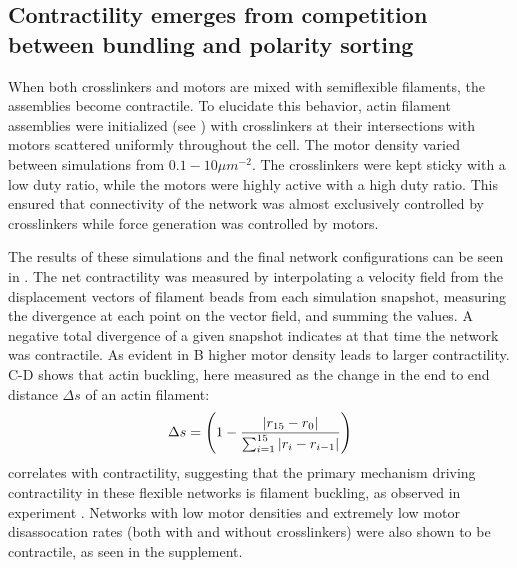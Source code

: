 \documentclass[12pt]{article}
\begin{document}
\subsection{Contractility emerges from competition between bundling and polarity sorting}
\par
When both crosslinkers and motors are mixed with semiflexible filaments, the
assemblies become contractile. To elucidate this behavior, actin filament 
assemblies were initialized (see ) with crosslinkers at their
intersections with motors scattered uniformly throughout the cell. The motor
density varied between simulations from $0.1-10\mu m^{-2}$. The crosslinkers 
were kept sticky with a low duty ratio, while the motors were highly active with
a high duty ratio. This ensured that connectivity of the network was almost
exclusively controlled by crosslinkers while force generation was controlled by
motors. 
\par
The results of these simulations and the final network configurations can be
seen in . The net contractility was measured by
interpolating a velocity field from the displacement vectors of filament beads
from each simulation snapshot, 
measuring the divergence at each point on the vector field, and summing the 
values. A negative total divergence of a given snapshot indicates at that time
the network was contractile. As evident in B
higher motor density leads to larger contractility. C-D shows
that actin buckling, here measured as the change in the end to end distance
$\Delta s$ of an actin filament:
\begin{equation} 
  \Delta s = \left(1 - {|r_{15}-r_0|\over\sum_{i=1}^{15}{|r_i-r_{i-1}|}}\right) 
  \label{eqn:fil_strain}
\end{equation} 
correlates with contractility, suggesting that the primary mechanism driving
contractility in these flexible networks is filament buckling, as observed 
in experiment \cite{murrell2012}. Networks with low motor densities and extremely
low motor disassocation rates (both with and without crosslinkers) were also 
shown to be contractile, as seen in the supplement.
\end{document}
